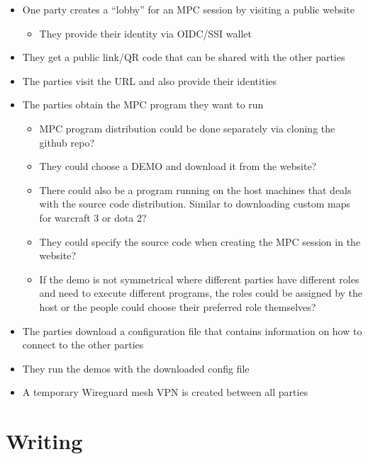 \begin{itemize}
\tightlist
\item
  One party creates a ``lobby'' for an MPC session by visiting a public
  website

  \begin{itemize}
  \tightlist
  \item
    They provide their identity via OIDC/SSI wallet
  \end{itemize}
\item
  They get a public link/QR code that can be shared with the other
  parties
\item
  The parties visit the URL and also provide their identities
\item
  The parties obtain the MPC program they want to run

  \begin{itemize}
  \tightlist
  \item
    MPC program distribution could be done separately via cloning the
    github repo?
  \item
    They could choose a DEMO and download it from the website?
  \item
    There could also be a program running on the host machines that
    deals with the source code distribution. Similar to downloading
    custom maps for warcraft 3 or dota 2?
  \item
    They could specify the source code when creating the MPC session in
    the website?
  \item
    If the demo is not symmetrical where different parties have
    different roles and need to execute different programs, the roles
    could be assigned by the host or the people could choose their
    preferred role themselves?
  \end{itemize}
\item
  The parties download a configuration file that contains information on
  how to connect to the other parties
\item
  They run the demos with the downloaded config file
\item
  A temporary Wireguard mesh VPN is created between all parties
\end{itemize}

\hypertarget{notes__04000-writing.md}{}
\hypertarget{notes__04000-writing.md__writing}{%
\chapter{Writing}\label{notes__04000-writing.md__writing}}

